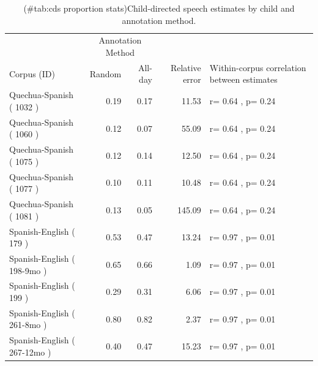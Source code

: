 \documentclass[
]{article}
\begin{document}
\begin{table}[!h]

\caption{(\#tab:cds proportion stats)Child-directed speech estimates by child and annotation method.}
\centering
\begin{tabular}[t]{lrrr>{\raggedright\arraybackslash}p{5cm}}
\toprule
\multicolumn{1}{c}{ } & \multicolumn{2}{c}{Annotation Method} & \multicolumn{2}{c}{ } \\
\cmidrule(l{3pt}r{3pt}){2-3}
Corpus (ID) & Random & All-day & Relative error & Within-corpus correlation between estimates\\
\midrule
Quechua-Spanish ( 1032 ) & 0.19 & 0.17 & 11.53 & r= 0.64 , p= 0.24\\
Quechua-Spanish ( 1060 ) & 0.12 & 0.07 & 55.09 & r= 0.64 , p= 0.24\\
Quechua-Spanish ( 1075 ) & 0.12 & 0.14 & 12.50 & r= 0.64 , p= 0.24\\
Quechua-Spanish ( 1077 ) & 0.10 & 0.11 & 10.48 & r= 0.64 , p= 0.24\\
Quechua-Spanish ( 1081 ) & 0.13 & 0.05 & 145.09 & r= 0.64 , p= 0.24\\
\addlinespace
Spanish-English ( 179 ) & 0.53 & 0.47 & 13.24 & r= 0.97 , p= 0.01\\
Spanish-English ( 198-9mo ) & 0.65 & 0.66 & 1.09 & r= 0.97 , p= 0.01\\
Spanish-English ( 199 ) & 0.29 & 0.31 & 6.06 & r= 0.97 , p= 0.01\\
Spanish-English ( 261-8mo ) & 0.80 & 0.82 & 2.37 & r= 0.97 , p= 0.01\\
Spanish-English ( 267-12mo ) & 0.40 & 0.47 & 15.23 & r= 0.97 , p= 0.01\\
\bottomrule
\end{tabular}
\end{table}
\end{document}
